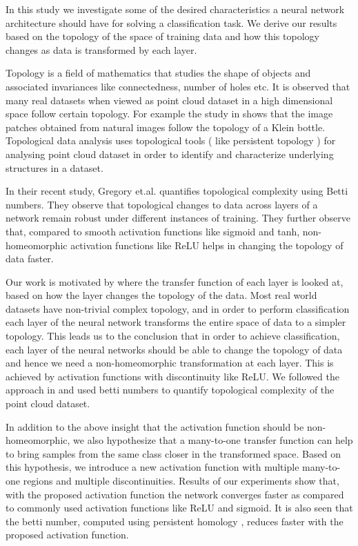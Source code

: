 \documentclass{bmvc2k}
\begin{document}
In this study we investigate some of the  desired characteristics a neural network architecture should have for solving a classification task.
We derive our results based on the topology of the space of training data and how this topology changes as data is transformed by each layer.

Topology is a field of mathematics that studies the shape of objects and associated invariances like connectedness, number of holes etc.
It is observed that many real datasets when viewed as point cloud dataset in a high dimensional space follow  certain topology.
For example the study  in \cite{carlsson2009topology} shows that the image patches obtained from natural images follow the topology of a Klein bottle.
Topological data analysis\cite{carlsson2009topology}\cite{chazal2017introduction} uses topological tools ( like persistent topology ) for analysing point cloud dataset in order to identify and characterize underlying structures in a dataset.

In their recent study, Gregory et.al. \cite{naitzat2020topology}  quantifies topological complexity using Betti numbers.
They observe that topological changes to data across layers of a network remain robust under different instances of training.
They further observe that, compared to smooth activation functions like sigmoid and tanh, non-homeomorphic activation functions like ReLU helps in changing the topology of data faster.

Our work is motivated by \cite{naitzat2020topology} where the transfer function of each layer is looked at, based on  how the layer changes the topology of the data.
Most real world datasets have non-trivial complex topology, and in order to perform classification each layer of the neural network transforms the entire space of data to a simpler topology.
This leads us to the conclusion that in order to achieve classification, each layer of the neural networks should be able to change the topology of data and hence we need a non-homeomorphic transformation at each layer.
This is achieved by activation functions with discontinuity like ReLU. We followed the approach in \cite{naitzat2020topology} and used betti numbers to quantify  topological complexity of the point cloud dataset.

In addition to the above insight that the activation function should be non-homeomorphic, we also hypothesize that a many-to-one transfer function can help to bring samples from the same class closer in the transformed space.
Based on this hypothesis, we introduce a new activation function with multiple many-to-one regions and multiple discontinuities.
Results of our experiments show that, with the proposed activation function the network converges faster as compared to commonly used activation functions like ReLU and sigmoid.
It is also seen that the betti number, computed using persistent homology \cite{naitzat2020topology}, reduces faster with the proposed activation function.
\end{document}

